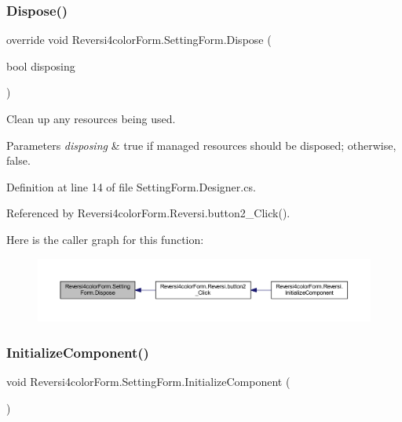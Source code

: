 \subsubsection{\texorpdfstring{Dispose()}{Dispose()}}
{\footnotesize\ttfamily override void Reversi4color\+Form.\+Setting\+Form.\+Dispose (\begin{DoxyParamCaption}\item[{bool}]{disposing }\end{DoxyParamCaption})\hspace{0.3cm}{\ttfamily [protected]}}



Clean up any resources being used. 


\begin{DoxyParams}{Parameters}
{\em disposing} & true if managed resources should be disposed; otherwise, false.\\
\hline
\end{DoxyParams}


Definition at line 14 of file Setting\+Form.\+Designer.\+cs.



Referenced by Reversi4color\+Form.\+Reversi.\+button2\+\_\+\+Click().

Here is the caller graph for this function\+:
\nopagebreak
\begin{figure}[H]
\begin{center}
\leavevmode
\includegraphics[width=350pt]{class_reversi4color_form_1_1_setting_form_aea34274bc1a5cf018805d0bd6b429a77_icgraph}
\end{center}
\end{figure}
\mbox{\label{class_reversi4color_form_1_1_setting_form_a16ffb6338dd99bb75b8b52e8df9fe271}} 
\subsubsection{\texorpdfstring{Initialize\+Component()}{InitializeComponent()}}
{\footnotesize\ttfamily void Reversi4color\+Form.\+Setting\+Form.\+Initialize\+Component (\begin{DoxyParamCaption}{ }\end{DoxyParamCaption})\hspace{0.3cm}{\ttfamily [private]}}



